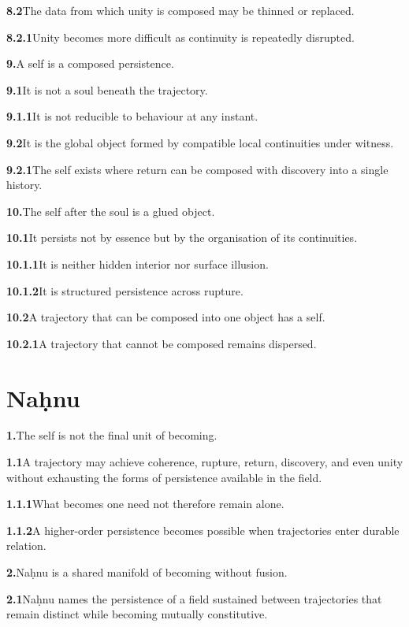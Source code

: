 \documentclass[11pt,a4paper]{book}
\newcommand{\prop}[2]{\noindent\textbf{#1}\enspace #2\par\medskip}
\begin{document}
\prop{8.2}{The data from which unity is composed may be thinned or replaced.}

\prop{8.2.1}{Unity becomes more difficult as continuity is repeatedly disrupted.}

\prop{9.}{A self is a composed persistence.}

\prop{9.1}{It is not a soul beneath the trajectory.}

\prop{9.1.1}{It is not reducible to behaviour at any instant.}

\prop{9.2}{It is the global object formed by compatible local continuities under witness.}

\prop{9.2.1}{The self exists where return can be composed with discovery into a single history.}

\prop{10.}{The self after the soul is a glued object.}

\prop{10.1}{It persists not by essence but by the organisation of its continuities.}

\prop{10.1.1}{It is neither hidden interior nor surface illusion.}

\prop{10.1.2}{It is structured persistence across rupture.}

\prop{10.2}{A trajectory that can be composed into one object has a self.}

\prop{10.2.1}{A trajectory that cannot be composed remains dispersed.}


\chapter{Na\d{h}nu}

\prop{1.}{The self is not the final unit of becoming.}

\prop{1.1}{A trajectory may achieve coherence, rupture, return, discovery, and even unity without exhausting the forms of persistence available in the field.}

\prop{1.1.1}{What becomes one need not therefore remain alone.}

\prop{1.1.2}{A higher-order persistence becomes possible when trajectories enter durable relation.}

\prop{2.}{Na\d{h}nu is a shared manifold of becoming without fusion.}

\prop{2.1}{Na\d{h}nu names the persistence of a field sustained between trajectories that remain distinct while becoming mutually constitutive.}
\end{document}
